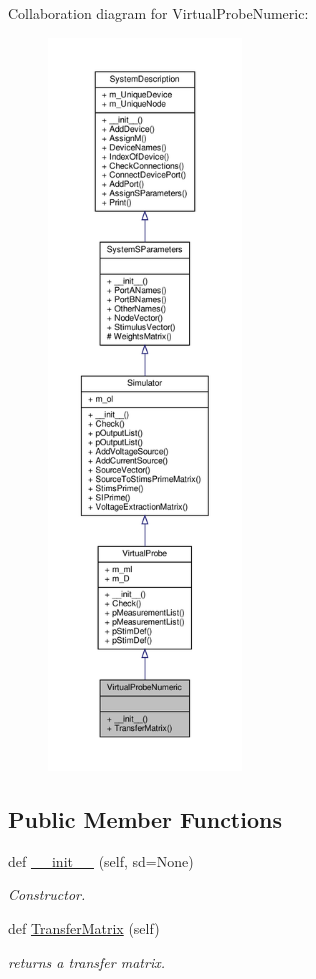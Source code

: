 Collaboration diagram for Virtual\+Probe\+Numeric\+:\nopagebreak
\begin{figure}[H]
\begin{center}
\leavevmode
\includegraphics[height=550pt]{classSignalIntegrity_1_1SystemDescriptions_1_1VirtualProbeNumeric_1_1VirtualProbeNumeric__coll__graph}
\end{center}
\end{figure}
\subsection*{Public Member Functions}
\begin{DoxyCompactItemize}
\item 
def \hyperlink{classSignalIntegrity_1_1SystemDescriptions_1_1VirtualProbeNumeric_1_1VirtualProbeNumeric_a2fa2ae61a4511a760e2d2047ec07eb05}{\+\_\+\+\_\+init\+\_\+\+\_\+} (self, sd=None)
\begin{DoxyCompactList}\small\item\em Constructor. \end{DoxyCompactList}\item 
def \hyperlink{classSignalIntegrity_1_1SystemDescriptions_1_1VirtualProbeNumeric_1_1VirtualProbeNumeric_aecf838369a0d4e9037ba351539bd8eb1}{Transfer\+Matrix} (self)
\begin{DoxyCompactList}\small\item\em returns a transfer matrix. \end{DoxyCompactList}\end{DoxyCompactItemize}
